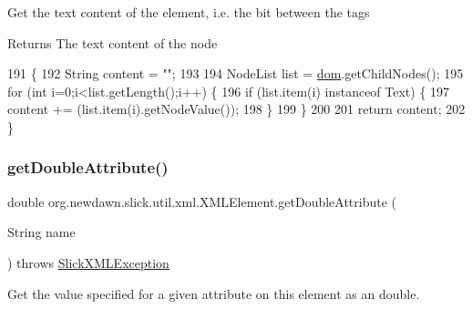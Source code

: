 Get the text content of the element, i.\+e. the bit between the tags

\begin{DoxyReturn}{Returns}
The text content of the node 
\end{DoxyReturn}

\begin{DoxyCode}
191                                \{
192         String content = \textcolor{stringliteral}{""};
193         
194         NodeList list = \mbox{\hyperlink{classorg_1_1newdawn_1_1slick_1_1util_1_1xml_1_1_x_m_l_element_a97e3ba0c57e0822e9111fd770807e64e}{dom}}.getChildNodes();
195         \textcolor{keywordflow}{for} (\textcolor{keywordtype}{int} i=0;i<list.getLength();i++) \{
196             \textcolor{keywordflow}{if} (list.item(i) instanceof Text) \{
197                 content += (list.item(i).getNodeValue());
198             \}
199         \}
200         
201         \textcolor{keywordflow}{return} content;
202     \}
\end{DoxyCode}
\mbox{\label{classorg_1_1newdawn_1_1slick_1_1util_1_1xml_1_1_x_m_l_element_a9815012aef305d3f0247544a681b25b1}} 
\subsubsection{\texorpdfstring{get\+Double\+Attribute()}{getDoubleAttribute()}\hspace{0.1cm}{\footnotesize\ttfamily [1/2]}}
{\footnotesize\ttfamily double org.\+newdawn.\+slick.\+util.\+xml.\+X\+M\+L\+Element.\+get\+Double\+Attribute (\begin{DoxyParamCaption}\item[{String}]{name }\end{DoxyParamCaption}) throws \mbox{\hyperlink{classorg_1_1newdawn_1_1slick_1_1util_1_1xml_1_1_slick_x_m_l_exception}{Slick\+X\+M\+L\+Exception}}\hspace{0.3cm}{\ttfamily [inline]}}

Get the value specified for a given attribute on this element as an double.


